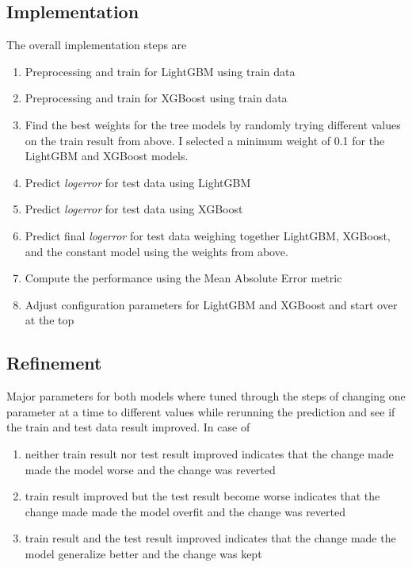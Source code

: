\documentclass[a4paper]{article}
\begin{document}
\subsection{Implementation}
The overall implementation steps are
\begin{enumerate}
    \item Preprocessing and train for LightGBM using train data
    \item Preprocessing and train for XGBoost using train data
    \item Find the best weights for the tree models by randomly trying different values on the train result from above. I selected a minimum weight of 0.1 for the LightGBM and XGBoost models.
    \item Predict \textit{logerror} for test data using LightGBM
    \item Predict \textit{logerror} for test data using XGBoost
    \item Predict final \textit{logerror} for test data weighing together LightGBM, XGBoost, and the constant model using the weights from above.
    \item Compute the performance using the Mean Absolute Error metric
    \item Adjust configuration parameters for LightGBM and XGBoost and start over at the top
\end{enumerate}


\subsection{Refinement}
Major parameters for both models where tuned through the steps of changing one parameter at a time to different values while rerunning the prediction and see if the train and test data result improved. In case of
\begin{enumerate}
    \item neither train result nor test result improved indicates that the change made made the model worse and the change was reverted
    \item train result improved but the test result become worse indicates that the change made made the model overfit and the change was reverted
    \item train result and the test result improved indicates that the change made the model generalize better and the change was kept
\end{enumerate}
\end{document}
